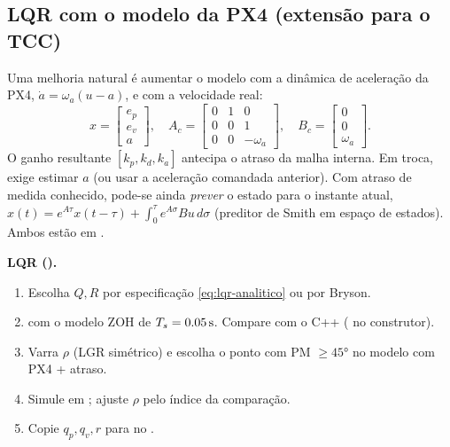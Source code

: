 \subsection{LQR com o modelo da PX4 (extensão para o TCC)}
Uma melhoria natural é aumentar o modelo com a dinâmica de aceleração da PX4,
$\dot a = \omega_a(u - a)$, e com a velocidade real:
\begin{equation}
  x = \begin{bmatrix}e_p\\ e_v\\ a\end{bmatrix},\quad
  A_c=\begin{bmatrix}0&1&0\\0&0&1\\0&0&-\omega_a\end{bmatrix},\quad
  B_c=\begin{bmatrix}0\\0\\ \omega_a\end{bmatrix}.
\end{equation}
O ganho resultante $[k_p,k_d,k_a]$ antecipa o atraso da malha interna. Em troca,
exige estimar $a$ (ou usar a aceleração comandada anterior). Com atraso de medida
conhecido, pode-se ainda \emph{prever} o estado para o instante atual,
$\hat x(t) = e^{A\tau}x(t-\tau) + \int_0^\tau e^{A\sigma}Bu\,d\sigma$ (preditor de
Smith em espaço de estados). Ambos estão em .

\begin{receita}
\textbf{LQR ().}
\begin{enumerate}
  \item Escolha $Q,R$ por especificação \eqref{eq:lqr-analitico} ou por Bryson.
  \item {} com o modelo ZOH de $T_s=\SI{0,05}{s}$.
        Compare com o C++ ( no construtor).
  \item Varra $\rho$ (LGR simétrico) e escolha o ponto com PM $\ge\ang{45}$ no modelo
        com PX4 + atraso.
  \item Simule em ; ajuste $\rho$ pelo índice da comparação.
  \item Copie $q_p,q_v,r$ para  no .
\end{enumerate}
\end{receita}
